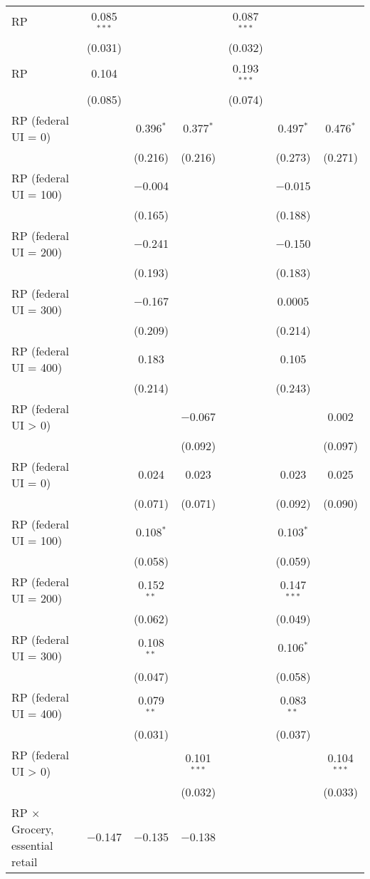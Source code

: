 \begin{table}[!htbp]
\begin{tabular}{@{\extracolsep{5pt}}lcccccc}
  RP & 0.085$^{***}$ &  &  & 0.087$^{***}$ &  &  \\ 
  & (0.031) &  &  & (0.032) &  &  \\ 
  RP & 0.104 &  &  & 0.193$^{***}$ &  &  \\ 
  & (0.085) &  &  & (0.074) &  &  \\ 
  RP (federal UI = 0) &  & 0.396$^{*}$ & 0.377$^{*}$ &  & 0.497$^{*}$ & 0.476$^{*}$ \\ 
  &  & (0.216) & (0.216) &  & (0.273) & (0.271) \\ 
  RP (federal UI = 100) &  & $-$0.004 &  &  & $-$0.015 &  \\ 
  &  & (0.165) &  &  & (0.188) &  \\ 
  RP (federal UI = 200) &  & $-$0.241 &  &  & $-$0.150 &  \\ 
  &  & (0.193) &  &  & (0.183) &  \\ 
  RP (federal UI = 300) &  & $-$0.167 &  &  & 0.0005 &  \\ 
  &  & (0.209) &  &  & (0.214) &  \\ 
  RP (federal UI = 400) &  & 0.183 &  &  & 0.105 &  \\ 
  &  & (0.214) &  &  & (0.243) &  \\ 
  RP (federal UI > 0) &  &  & $-$0.067 &  &  & 0.002 \\ 
  &  &  & (0.092) &  &  & (0.097) \\ 
  RP (federal UI = 0) &  & 0.024 & 0.023 &  & 0.023 & 0.025 \\ 
  &  & (0.071) & (0.071) &  & (0.092) & (0.090) \\ 
  RP (federal UI = 100) &  & 0.108$^{*}$ &  &  & 0.103$^{*}$ &  \\ 
  &  & (0.058) &  &  & (0.059) &  \\ 
  RP (federal UI = 200) &  & 0.152$^{**}$ &  &  & 0.147$^{***}$ &  \\ 
  &  & (0.062) &  &  & (0.049) &  \\ 
  RP (federal UI = 300) &  & 0.108$^{**}$ &  &  & 0.106$^{*}$ &  \\ 
  &  & (0.047) &  &  & (0.058) &  \\ 
  RP (federal UI = 400) &  & 0.079$^{**}$ &  &  & 0.083$^{**}$ &  \\ 
  &  & (0.031) &  &  & (0.037) &  \\ 
  RP (federal UI > 0) &  &  & 0.101$^{***}$ &  &  & 0.104$^{***}$ \\ 
  &  &  & (0.032) &  &  & (0.033) \\ 
  RP $\times$ Grocery, essential retail & $-$0.147 & $-$0.135 & $-$0.138 &  &  &  \\ 

\end{tabular}
\end{table}
